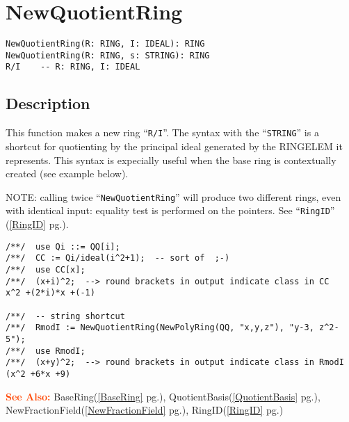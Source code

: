 \documentclass[a4paper]{mybook}
\newenvironment{command}{}{} %
\newcommand\SeeAlso{\par\textcolor{OrangeRed}{\textbf{\large See Also: }}}
\begin{document}
\section{NewQuotientRing}
\label{NewQuotientRing}
\begin{command} %


\begin{Verbatim}[label=syntax, rulecolor=\color{MidnightBlue},
frame=single]
NewQuotientRing(R: RING, I: IDEAL): RING
NewQuotientRing(R: RING, s: STRING): RING
R/I    -- R: RING, I: IDEAL
\end{Verbatim}


\subsection*{Description}

This function makes a new ring ``\verb&R/I&''.
The syntax with the ``\verb&STRING&'' is a shortcut for quotienting by the 
principal ideal generated by the RINGELEM it represents.
This syntax is expecially useful when the base ring is contextually created
(see example below).
\par 
NOTE: calling twice ``\verb&NewQuotientRing&'' will produce
two different rings, even with identical input: equality test is
performed on the pointers.  See ``\verb&RingID&'' (\ref{RingID} pg.\pageref{RingID}).
\begin{Verbatim}[label=example, rulecolor=\color{PineGreen}, frame=single]
/**/  use Qi ::= QQ[i];
/**/  CC := Qi/ideal(i^2+1);  -- sort of  ;-)
/**/  use CC[x];
/**/  (x+i)^2;  --> round brackets in output indicate class in CC
x^2 +(2*i)*x +(-1)

/**/  -- string shortcut
/**/  RmodI := NewQuotientRing(NewPolyRing(QQ, "x,y,z"), "y-3, z^2-5");
/**/  use RmodI;
/**/  (x+y)^2;  --> round brackets in output indicate class in RmodI
(x^2 +6*x +9)
\end{Verbatim}


\SeeAlso %
  BaseRing(\ref{BaseRing} pg.\pageref{BaseRing}), 
    QuotientBasis(\ref{QuotientBasis} pg.\pageref{QuotientBasis}), 
    NewFractionField(\ref{NewFractionField} pg.\pageref{NewFractionField}), 
    RingID(\ref{RingID} pg.\pageref{RingID})
\end{command} %
\end{document}
